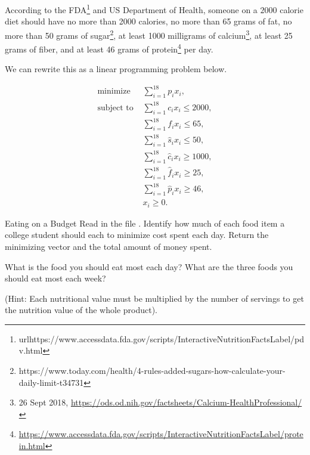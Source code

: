  According to the FDA\footnote[1]{url{https://www.accessdata.fda.gov/scripts/InteractiveNutritionFactsLabel/pdv.html}} and US Department of Health, someone on a $2000$ calorie diet should have no more than 2000 calories, no more than 65 grams of fat, no more than 50 grams of sugar\footnote[2]{https://www.today.com/health/4-rules-added-sugars-how-calculate-your-daily-limit-t34731}, at least 1000 milligrams of calcium\footnote[1]{26 Sept 2018, \url{https://ods.od.nih.gov/factsheets/Calcium-HealthProfessional/}}, at least 25 grams of fiber, and at least 46 grams of protein\footnote[2]{\url{https://www.accessdata.fda.gov/scripts/InteractiveNutritionFactsLabel/protein.html}} per day.

 We can rewrite this as a linear programming problem below.

 \begin{align*}
\text{minimize } & \sum_{i=1}^{18}p_ix_i, \\
\text{subject to }& \sum_{i=1}^{18} c_ix_i \leq 2000, \\
			& \sum_{i=1}^{18} f_ix_i \leq 65, \\
			& \sum_{i=1}^{18} \hat{s}_ix_i \leq 50, \\
			& \sum_{i=1}^{18} \hat{c}_ix_i \geq 1000, \\
			& \sum_{i=1}^{18} \hat{f}_ix_i \geq 25, \\
			& \sum_{i=1}^{18} \hat{p}_ix_i \geq 46, \\
			& x_i \geq 0.
\end{align*}

 \begin{problem}{Eating on a Budget}{}
Read in the file .
Identify how much of each food item a college student should each to minimize cost spent each day.
Return the minimizing vector and the total amount of money spent.

What is the food you should eat most each day? 
What are the three foods you should eat most each week?

(Hint: Each nutritional value must be multiplied by the number of servings to get the nutrition value of the whole product).
\label{prob:diet}
\end{problem}









